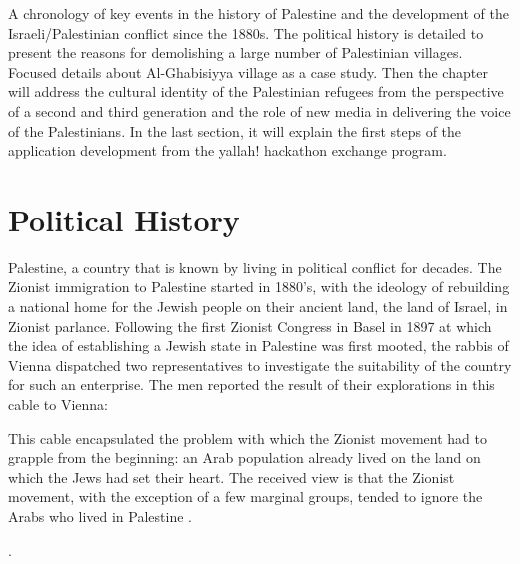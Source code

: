 A chronology of key events in the history of Palestine and the development of the Israeli/Palestinian conflict since the 1880s. The political history is detailed to present the reasons for demolishing a large number of Palestinian villages. Focused details about Al-Ghabisiyya village as a case study. Then the chapter will address the cultural identity of the Palestinian refugees from the perspective of a second and third generation and the role of new media in delivering the voice of the Palestinians. In the last section, it will explain the first steps of the application development from the \acrshort{yallah!} hackathon exchange program.  
\section{Political History}
Palestine, a country that is known by living in political conflict for decades.
The Zionist immigration to Palestine started in 1880's, with the ideology of rebuilding a national home for the Jewish people on their ancient land, the land of Israel, in Zionist parlance\citep{Morris2004, Pappe2006, Khalidi2015}.
Following the first Zionist Congress in Basel in 1897 at which the idea of
establishing a Jewish state in Palestine was first mooted, the rabbis of Vienna
dispatched two representatives to investigate the suitability of the country for
such an enterprise. The men reported the result of their explorations in this cable
to Vienna:




\centerline{\textit{}}

This cable encapsulated the problem with which the Zionist movement had to grapple from the beginning: an Arab population already lived on the land on which the Jews had set their heart. The received view is that the Zionist movement, with the exception of a few marginal groups, tended to ignore the Arabs who lived in Palestine \citep{Shlaim2014, Karmi2007}.

 \cite[p.11]{Pappe2006}.

